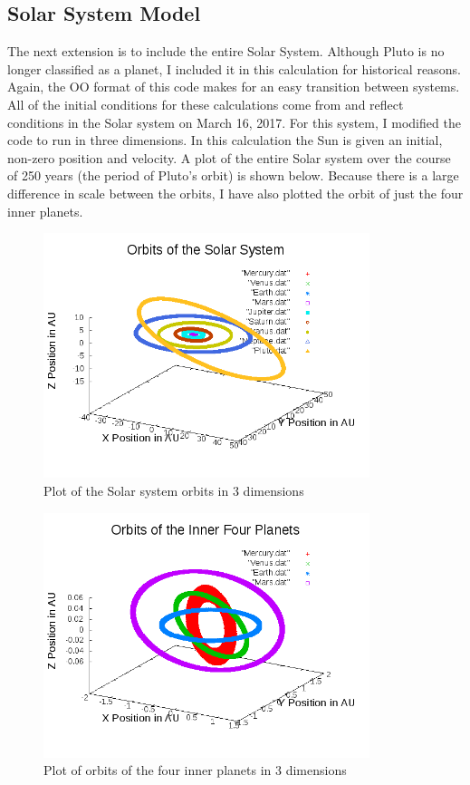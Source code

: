 \documentclass[%
oneside,                 %
final,                   %
10pt]{article}
\begin{document}
\subsection{Solar System Model}

The next extension is to include the entire Solar System.  Although Pluto is no longer classified as a planet, I included it in this calculation for historical reasons.  Again, the OO format of this code makes for an easy transition between systems.  All of the initial conditions for these calculations come from \cite{JPL} and reflect conditions in the Solar system on March 16, 2017.  For this system, I modified the code to run in three dimensions. In this calculation the Sun is given an initial, non-zero position and velocity.  A plot of the entire Solar system over the course of 250 years (the period of Pluto's orbit) is shown below.  Because there is a large difference in scale between the orbits, I have also plotted the orbit of just the four inner planets. 

\begin{figure}[H]\label{fig:velrplot}
  \centering
    \includegraphics[width=0.85\textwidth]{solarsystem.png}
    \caption{Plot of the Solar system orbits in 3 dimensions}
\end{figure}


\begin{figure}[H]\label{fig:velrplot}
  \centering
    \includegraphics[width=0.85\textwidth]{innersolarsystem.png}
    \caption{Plot of orbits of the four inner planets in 3 dimensions}
\end{figure}
\end{document}
